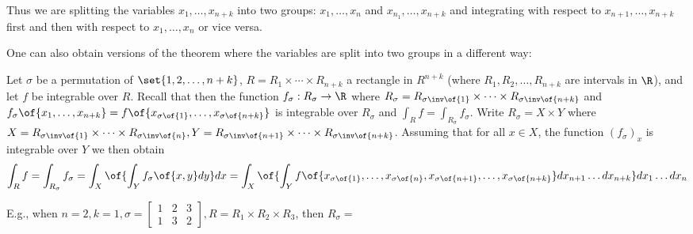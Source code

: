 Thus we are splitting the variables $x_1, \dots, x_{n+k}$ into two groups: $x_1,\dots,x_n$ and $x_{n_1},\dots,x_{n+k}$ and integrating with respect to $x_{n+1},\dots,x_{n+k}$ first and then with respect to $x_1, \dots, x_n$ or vice versa.

One can also obtain versions of the theorem where the variables are split into two groups in a different way:

Let $\sigma$ be a permutation of $\set{1,2,\dots,n+k}$, $R = R_1 \times \cdots \times R_{n+k}$ a rectangle in $R^{n+k}$ (where $R_1,R_2,\dots,R_{n+k}$ are intervals in $\R$), and let $f$ be integrable over $R$. Recall that then the function $f_\sigma : R_\sigma \to \R$ where $R_\sigma = R_{\sigma\inv\of{1}} \times \cdots \times R_{\sigma\inv\of{n+k}}$ and $f_\sigma\of{x_1,\dots,x_{n+k}} = f\of{x_{\sigma\of{1}},\dots,x_{\sigma\of{n+k}}}$ is integrable over $R_\sigma$ and $\int_R f = \int_{R_\sigma} f_\sigma$. Write $R_\sigma = X \times Y$ where $X = R_{\sigma\inv\of{1}} \times \cdots \times R_{\sigma\inv\of{n}}, Y=R_{\sigma\inv\of{n+1}} \times \cdots \times R_{\sigma\inv\of{n+k}}$. Assuming that for all $x \in X$, the function $(f_\sigma)_x$ is integrable over $Y$ we then obtain \[ \int_R f = \int_{R_\sigma} f_\sigma = \int_X \of{ \int_Y f_\sigma\of{x,y} dy} dx = \int_X \of{ \int_Y f\of{x_{\sigma\of{1}}, \dots, x_{\sigma\of{n}}, x_{\sigma\of{n+1}}, \dots, x_{\sigma\of{n+k}}} dx_{n+1}\dots dx_{n+k}}dx_1 \dots dx_n\]

E.g., when $n=2, k=1, \sigma=\begin{bmatrix} 1 & 2 & 3 \\ 1 & 3 & 2 \end{bmatrix}, R=R_1 \times R_2 \times R_3$, then $R_\sigma = $

